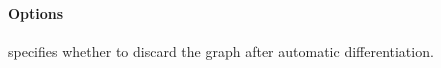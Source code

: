 \paragraph{Options}\label{para:options}
\begin{optionsbox}\nospacing
    \begin{option}[\pythoninline{retain_graph=None}]
          specifies whether to discard the graph after automatic differentiation.
    \end{option}
\end{optionsbox}


